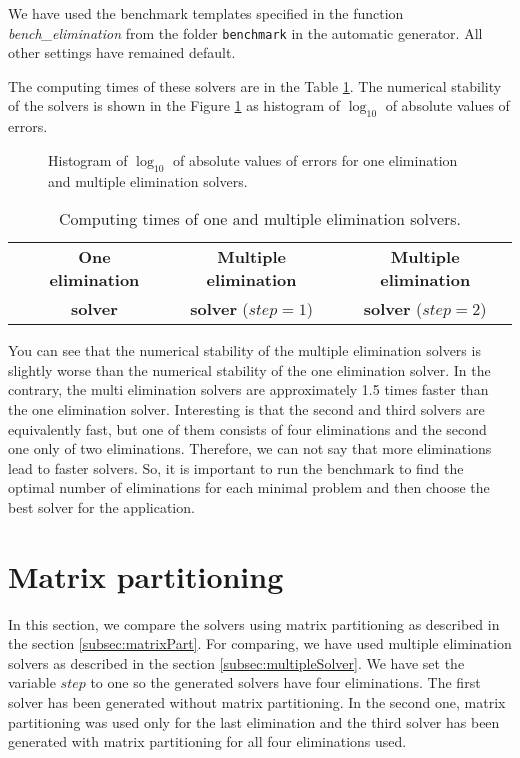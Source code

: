 We have used the benchmark templates specified in the function \textit{bench\_elimination} from the folder \texttt{benchmark} in the automatic generator. All other settings have remained default.

The computing times of these solvers are in the Table \ref{tab:elim}. The numerical stability of the solvers is shown in the Figure \ref{graph:elim} as histogram of $\log_{10}$ of absolute values of errors.

\begin{figure}[ht]
  \centering
  \resizebox{0.95\textwidth}{!}{}
  \caption{Histogram of $\log_{10}$ of absolute values of errors for one elimination and multiple elimination solvers.}
  \label{graph:elim}
\end{figure}

\begin{table}[ht]
  \centering
  \begin{tabular}{|c||ccc|}
    \hline
      & \textbf{One elimination} & \textbf{Multiple elimination} & \textbf{Multiple elimination} \\
      & \textbf{solver}          & \textbf{solver} ($step = 1$)  & \textbf{solver} ($step = 2$)\\
    \hline\hline
    
    \hline
  \end{tabular}
  \caption{Computing times of one and multiple elimination solvers.}
  \label{tab:elim}
\end{table}

You can see that the numerical stability of the multiple elimination solvers is slightly worse than the numerical stability of the one elimination solver. In the contrary, the multi elimination solvers are approximately 1.5 times faster than the one elimination solver. Interesting is that the second and third solvers are equivalently fast, but one of them consists of four eliminations and the second one only of two eliminations. Therefore, we can not say that more eliminations lead to faster solvers. So, it is important to run the benchmark to find the optimal number of eliminations for each minimal problem and then choose the best solver for the application.

\section{Matrix partitioning}
In this section, we compare the solvers using matrix partitioning as described in the section \ref{subsec:matrixPart}. For comparing, we have used multiple elimination solvers as described in the section \ref{subsec:multipleSolver}. We have set the variable $step$ to one so the generated solvers have four eliminations. The first solver has been generated without matrix partitioning. In the second one, matrix partitioning was used only for the last elimination and the third solver has been generated with matrix partitioning for all four eliminations used.


